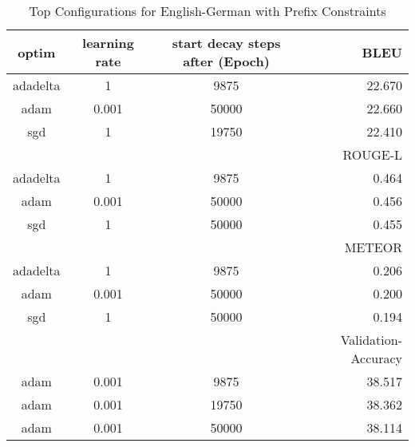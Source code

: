 \begin{table}
	\caption{Top Configurations for English-German with Prefix Constraints}
	\label{tab:optim_tagged-de-en}
	\centering
\begin{tabular}{|c|c|c|r|}
	\hline
	optim   & learning rate & start decay steps after (Epoch)  & BLEU\\
	\hline
	 adadelta&       1     &        9875    & 22.670\\
	   adam &     0.001   &       50000     & 22.660\\
	   sgd  &       1     &       19750     & 22.410\\
	\hline
	\hline
	& & & ROUGE-L \\
	\hline
	 adadelta&       1     &        9875   & 0.464\\
	   adam &     0.001   &       50000    & 0.456\\
	   sgd  &       1     &       50000    & 0.455\\
	\hline
	\hline
	& & & METEOR \\
	\hline
	 adadelta&       1     &        9875     & 0.206\\
	   adam &     0.001   &       50000     & 0.200\\
	   sgd  &       1     &       50000     & 0.194\\
	\hline
	\hline
	& & & Validation-Accuracy \\
	\hline
	   adam &     0.001   &        9875     & 38.517\\
	   adam &     0.001   &       19750     & 38.362\\
	   adam &     0.001   &       50000     & 38.114\\
	\hline
\end{tabular}
\end{table}
